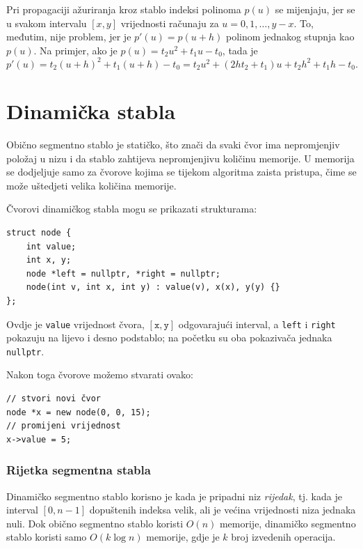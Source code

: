 Pri propagaciji ažuriranja kroz stablo
indeksi polinoma $p(u)$ se mijenjaju,
jer se u svakom intervalu $[x,y]$
vrijednosti
računaju za $u=0,1,\ldots,y-x$.
To, međutim, nije problem, jer je
$p'(u)=p(u+h)$ polinom
jednakog stupnja kao $p(u)$.
Na primjer, ako je $p(u)=t_2 u^2+t_1 u-t_0$, tada je
\[p'(u)=t_2(u+h)^2+t_1(u+h)-t_0=t_2 u^2 + (2ht_2+t_1)u+t_2h^2+t_1h-t_0.\]

\section{Dinamička stabla}


Obično segmentno stablo je statičko,
što znači da svaki čvor ima nepromjenjiv položaj
u nizu i da stablo zahtijeva
nepromjenjivu količinu memorije.
U 
memorija se dodjeljuje samo za čvorove
kojima se tijekom algoritma zaista pristupa,
čime se može uštedjeti velika količina memorije.

Čvorovi dinamičkog stabla mogu se prikazati strukturama:
\begin{lstlisting}
struct node {
    int value;
    int x, y;
    node *left = nullptr, *right = nullptr;
    node(int v, int x, int y) : value(v), x(x), y(y) {}
};
\end{lstlisting}
Ovdje je \texttt{value} vrijednost čvora,
$[\texttt{x},\texttt{y}]$ odgovarajući interval,
a \texttt{left} i \texttt{right} pokazuju na lijevo
i desno podstablo; na početku su oba pokazivača
jednaka \texttt{nullptr}.

Nakon toga čvorove možemo stvarati ovako:
\begin{lstlisting}
// stvori novi čvor
node *x = new node(0, 0, 15);
// promijeni vrijednost
x->value = 5;
\end{lstlisting}

\subsubsection{Rijetka segmentna stabla}


Dinamičko segmentno stablo korisno je kada
je pripadni niz \emph{rijedak},
tj. kada je interval $[0,n-1]$
dopuštenih indeksa velik,
ali je većina vrijednosti niza jednaka nuli.
Dok obično segmentno stablo koristi $O(n)$ memorije,
dinamičko segmentno stablo koristi samo $O(k \log n)$ memorije,
gdje je $k$ broj izvedenih operacija.

